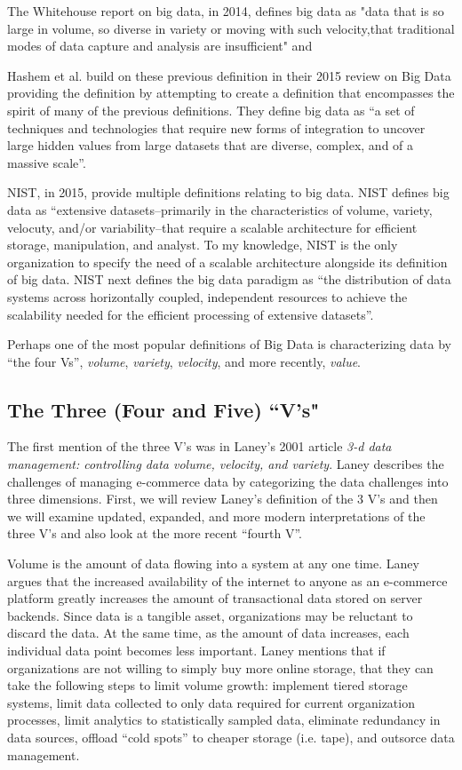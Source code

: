\documentclass[]{article}
\begin{document}
The Whitehouse report on big data\cite{pcast}, in 2014, defines big data as "data that is so large in volume, so diverse in variety or moving with such velocity,that traditional modes of data capture and  analysis  are  insufficient" and 

Hashem et al.\cite{hashem_rise_2015} build on these previous definition in their 2015 review on Big Data providing the definition by attempting to create a definition that encompasses the spirit of many of the previous definitions. They define big data as ``a set of techniques and technologies that require new forms of integration to uncover large hidden values from large datasets that are diverse, complex, and of a massive scale''.

NIST, in 2015, \cite{nist_big_data_2015} provide multiple definitions relating to big data. NIST defines big data as ``extensive datasets--primarily in the characteristics of volume, variety, velocuty, and/or variability--that require a scalable architecture for efficient storage, manipulation, and analyst. To my knowledge, NIST is the only organization to specify the need of a scalable architecture alongside its definition of big data. NIST next defines the big data paradigm as ``the distribution of data systems across horizontally coupled, independent resources to achieve the scalability needed for the efficient processing of extensive datasets''.

Perhaps one of the most popular definitions of Big Data is characterizing data by ``the four Vs''\cite{hashem_rise_2015}, \textit{volume}, \textit{variety}, \textit{velocity}, and more recently, \textit{value}. 

\subsection{The Three (Four and Five) ``V's"}
The first mention of the three V's was in Laney's 2001 article \textit{3-d data management: controlling data volume, velocity, and variety}\cite{laney20013d}. Laney describes the challenges of managing e-commerce data by categorizing the data challenges into three dimensions. First, we will review Laney's definition of the 3 V's and then we will examine updated, expanded, and more modern interpretations of the three V's and also look at the more recent ``fourth V''.

Volume is the amount of data flowing into a system at any one time. Laney argues that the increased availability of the internet to anyone as an e-commerce platform greatly increases the amount of transactional data stored on server backends. Since data is a tangible asset, organizations may be reluctant to discard the data. At the same time, as the amount of data increases, each individual data point becomes less important. Laney mentions that if organizations are not willing to simply buy more online storage, that they can take the following steps to limit volume growth: implement tiered storage systems, limit data collected to only data required for current organization processes, limit analytics to statistically sampled data, eliminate redundancy in data sources, offload ``cold spots'' to cheaper storage (i.e. tape), and outsorce data management. 
\end{document}
